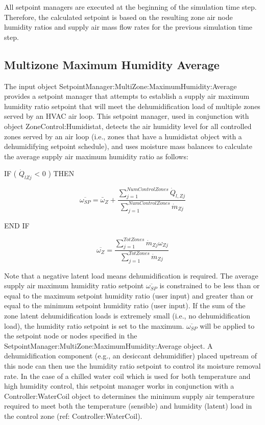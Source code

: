All setpoint managers are executed at the beginning of the simulation time step. Therefore, the calculated setpoint is based on the resulting zone air node humidity ratios and supply air mass flow rates for the previous simulation time step.

\subsection{Multizone Maximum Humidity Average}\label{multizone-maximum-humidity-average}

The input object SetpointManager:MultiZone:MaximumHumidity:Average provides a setpoint manager that attempts to establish a supply air maximum humidity ratio setpoint that will meet the dehumidification load of multiple zones served by an HVAC air loop. This setpoint manager, used in conjunction with object ZoneControl:Humidistat, detects the air humidity level for all controlled zones served by an air loop (i.e., zones that have a humidistat object with a dehumidifying setpoint schedule), and uses moisture mass balances to calculate the average supply air maximum humidity ratio as follows:

IF ( \({\dot Q_{lZj}}\) \textless{} 0 ) THEN

\begin{equation}
  \overline{{\omega}_{SP}} = \bar{\omega}_Z + \frac{\sum\limits_{j = 1}^{NumControlZones}\dot{Q}_{l,Zj}}{\sum\limits_{j = 1}^{NumControlZones}\dot{m}_{Zj}}
\end{equation}

END IF

\begin{equation}
  \overline{{\omega}_{Z}} = \frac{\sum\limits_{j = 1}^{TotZones}\dot{m}_{Zj}\omega_{Zj}}{\sum\limits_{j = 1}^{TotZones}\dot{m}_{Zj}}
\end{equation}

Note that a negative latent load means dehumidification is required. The average supply air maximum humidity ratio setpoint \({\overline{\omega_{SP}}}\) is constrained to be less than or equal to the maximum setpoint humidity ratio (user input) and greater than or equal to the minimum setpoint humidity ratio (user input). If the sum of the zone latent dehumidification loads is extremely small (i.e., no dehumidification load), the humidity ratio setpoint is set to the maximum. \({\overline{\omega_{SP}}}\) will be applied to the setpoint node or nodes specified in the SetpointManager:MultiZone:MaximumHumidity:Average object. A dehumidification component (e.g., an desiccant dehumidifier) placed upstream of this node can then use the humidity ratio setpoint to control its moisture removal rate. In the case of a chilled water coil which is used for both temperature and high humidity control, this setpoint manager works in conjunction with a Controller:WaterCoil object to determines the minimum supply air temperature required to meet both the temperature (sensible) and humidity (latent) load in the control zone (ref: Controller:WaterCoil).


